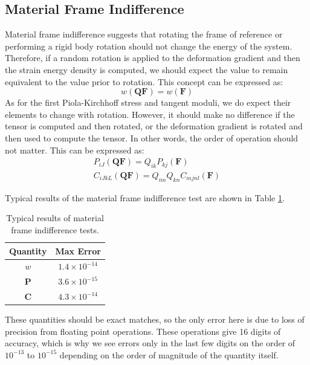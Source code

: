 \documentclass[]{spie}  %
\newcommand\Tstrut{\rule{0pt}{2.6ex}}         %
\begin{document}
\subsection{Material Frame Indifference}
Material frame indifference suggests that rotating the frame of reference or performing a rigid body rotation should not change the energy of the system. Therefore, if a random rotation is applied to the deformation gradient and then the strain energy density is computed, we should expect the value to remain equivalent to the value prior to rotation. This concept can be expressed as:
\begin{equation}
w(\bm{Q}\bm{F}) = w(\bm{F})
\end{equation}
As for the first Piola-Kirchhoff stress and tangent moduli, we do expect their elements to change with rotation. However, it should make no difference if the tensor is computed and then rotated, or the deformation gradient is rotated and then used to compute the tensor. In other words, the order of operation should not matter. This can be expressed as:
\begin{gather}
P_{iJ}(\bm{Q}\bm{F}) = Q_{ik}P_{kj}(\bm{F}) \\
C_{iJkL}(\bm{Q}\bm{F}) = Q_{im}Q_{kn}C_{mjnl}(\bm{F})
\end{gather}


Typical results of the material frame indifference test are shown in Table \ref{table: material frame indifference}.
\begin{table}[h]
	\centering
	\caption{Typical results of material frame indifference tests.}
	\begin{tabular}{ | c | c | }
		\hline
		Quantity & Max Error \Tstrut \\ \hline
		$w$ 		& $1.4 \times 10^{-14}$ \Tstrut \\
		$\bm{P}$ 	& $3.6 \times 10^{-15}$ \\
		$\bm{C}$ 	& $4.3 \times 10^{-14}$ \\
		\hline
	\end{tabular}
	\label{table: material frame indifference}
\end{table}

These quantities should be exact matches, so the only error here is due to loss of precision from floating point operations. These operations give 16 digits of accuracy, which is why we see errors only in the last few digits on the order of $10^{-13}$ to $10^{-15}$ depending on the order of magnitude of the quantity itself. 
\end{document}
